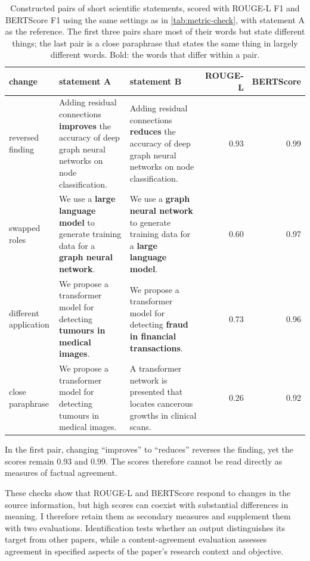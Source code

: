 \begin{table}[!ht]
  \centering
  \small
  \begin{tabular}{@{}p{1.8cm}p{4.0cm}p{4.0cm}rr@{}}
    \toprule
    \raggedright change & \raggedright statement A & \raggedright statement B & ROUGE-L & BERTScore \tabularnewline
    \midrule
    \raggedright reversed finding & \raggedright Adding residual connections \textbf{improves} the accuracy of deep graph neural networks on node classification. & \raggedright Adding residual connections \textbf{reduces} the accuracy of deep graph neural networks on node classification. & 0.93 & 0.99 \tabularnewline
    \addlinespace
    \raggedright swapped roles & \raggedright We use a \textbf{large language model} to generate training data for a \textbf{graph neural network}. & \raggedright We use a \textbf{graph neural network} to generate training data for a \textbf{large language model}. & 0.60 & 0.97 \tabularnewline
    \addlinespace
    \raggedright different application & \raggedright We propose a transformer model for detecting \textbf{tumours in medical images}. & \raggedright We propose a transformer model for detecting \textbf{fraud in financial transactions}. & 0.73 & 0.96 \tabularnewline
    \midrule
    \raggedright close paraphrase & \raggedright We propose a transformer model for detecting tumours in medical images. & \raggedright A transformer network is presented that locates cancerous growths in clinical scans. & 0.26 & 0.92 \tabularnewline
    \bottomrule
  \end{tabular}
  \caption{Constructed pairs of short scientific statements, scored with ROUGE-L F1 and BERTScore F1 using the same settings as in \autoref{tab:metric-check}, with statement A as the reference. The first three pairs share most of their words but state different things; the last pair is a close paraphrase that states the same thing in largely different words. Bold: the words that differ within a pair.}
  \label{tab:metric-pairs}
\end{table}

In the first pair, changing ``improves'' to ``reduces'' reverses the finding, yet the scores remain 0.93 and 0.99. The scores therefore cannot be read directly as measures of factual agreement.

These checks show that ROUGE-L and BERTScore respond to changes in the source information, but high scores can coexist with substantial differences in meaning. I therefore retain them as secondary measures and supplement them with two evaluations. Identification tests whether an output distinguishes its target from other papers, while a content-agreement evaluation assesses agreement in specified aspects of the paper's research context and objective.

